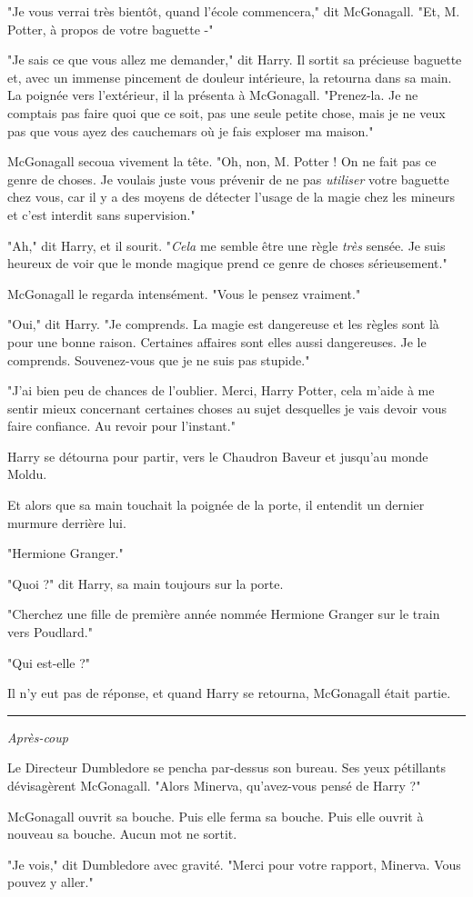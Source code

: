 "Je vous verrai très bientôt, quand l'école commencera," dit McGonagall. "Et, M. Potter, à propos de votre baguette -"

"Je sais ce que vous allez me demander," dit Harry. Il sortit sa précieuse baguette et, avec un immense pincement de douleur intérieure, la retourna dans sa main. La poignée vers l'extérieur, il la présenta à McGonagall. "Prenez-la. Je ne comptais pas faire quoi que ce soit, pas une seule petite chose, mais je ne veux pas que vous ayez des cauchemars où je fais exploser ma maison."

McGonagall secoua vivement la tête. "Oh, non, M. Potter ! On ne fait pas ce genre de choses. Je voulais juste vous prévenir de ne pas \emph{utiliser}  votre baguette chez vous, car il y a des moyens de détecter l'usage de la magie chez les mineurs et c'est interdit sans supervision."

"Ah," dit Harry, et il sourit. "\emph{Cela}  me semble être une règle \emph{très}  sensée. Je suis heureux de voir que le monde magique prend ce genre de choses sérieusement."

McGonagall le regarda intensément. "Vous le pensez vraiment."

"Oui," dit Harry. "Je comprends. La magie est dangereuse et les règles sont là pour une bonne raison. Certaines affaires sont elles aussi dangereuses. Je le comprends. Souvenez-vous que je ne suis pas stupide."

"J'ai bien peu de chances de l'oublier. Merci, Harry Potter, cela m'aide à me sentir mieux concernant certaines choses au sujet desquelles je vais devoir vous faire confiance. Au revoir pour l'instant."

Harry se détourna pour partir, vers le Chaudron Baveur et jusqu'au monde Moldu.

Et alors que sa main touchait la poignée de la porte, il entendit un dernier murmure derrière lui.

"Hermione Granger."

"Quoi ?" dit Harry, sa main toujours sur la porte.

"Cherchez une fille de première année nommée Hermione Granger sur le train vers Poudlard."

"Qui est-elle ?"

Il n'y eut pas de réponse, et quand Harry se retourna, McGonagall était partie.
\par\noindent\rule{\textwidth}{0.4pt}
\emph{Après-coup} 

Le Directeur Dumbledore se pencha par-dessus son bureau. Ses yeux pétillants dévisagèrent McGonagall. "Alors Minerva, qu'avez-vous pensé de Harry ?"

McGonagall ouvrit sa bouche. Puis elle ferma sa bouche. Puis elle ouvrit à nouveau sa bouche. Aucun mot ne sortit.

"Je vois," dit Dumbledore avec gravité. "Merci pour votre rapport, Minerva. Vous pouvez y aller."

